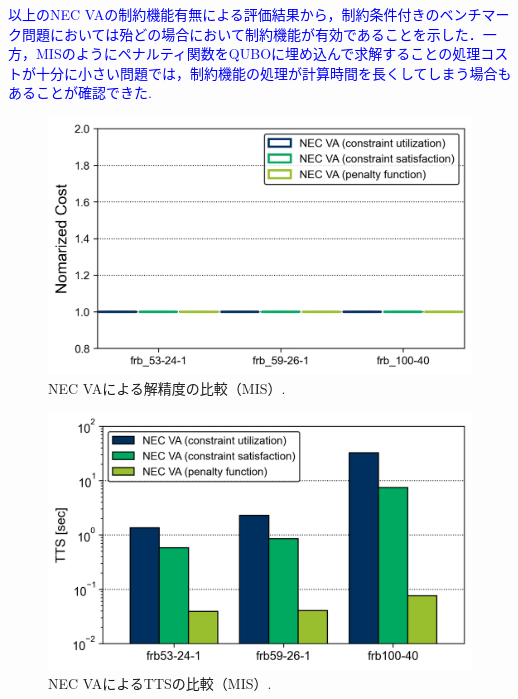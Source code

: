 \documentclass[submit,techrep,noauthor]{ipsj}
\begin{document}
\textcolor{blue}{以上のNEC VAの制約機能有無による評価結果から，制約条件付きのベンチマーク問題においては殆どの場合において制約機能が有効であることを示した．一方，MISのようにペナルティ関数をQUBOに埋め込んで求解することの処理コストが十分に小さい問題では，制約機能の処理が計算時間を長くしてしまう場合もあることが確認できた.} 

\begin{figure}[tb]
\centering
\includegraphics[bb=0 0 700 230, width=15cm]{Cost_MIS_VA.png}
\caption{NEC VAによる解精度の比較（MIS）.}
\label{Cost_MIS_VA}
\end{figure}

\begin{figure}[tb]
\centering
\includegraphics[bb=0 0 700 230, width=15cm]{TTS_MIS_VA.png}
\caption{NEC VAによるTTSの比較（MIS）.}
\label{TTS_MIS_VA}
\end{figure}
\end{document}
